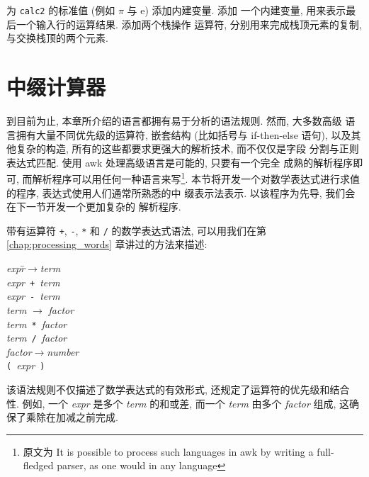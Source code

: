 \begin{exercise}
    \label{exer:calc2}
    为 \texttt{calc2} 的标准值 (例如 $\pi$ 与 $\mathrm{e}$) 添加内建变量.
    添加 一个内建变量, 用来表示最后一个输入行的运算结果. 添加两个栈操作
    运算符, 分别用来完成栈顶元素的复制, 与交换栈顶的两个元素.
\end{exercise}

\section{中缀计算器}
\label{sec:an_infix_calculator}

到目前为止, 本章所介绍的语言都拥有易于分析的语法规则. 然而, 大多数高级
语言拥有大量不同优先级的运算符, 嵌套结构 (比如括号与 if-then-else 语句),
以及其他复杂的构造, 所有的这些都要求更强大的解析技术, 而不仅仅是字段
分割与正则表达式匹配. 使用 awk 处理高级语言是可能的, 只要有一个完全
成熟的解析程序即可, 而解析程序可以用任何一种语言来写\footnote{原文为
    It is possible to process such languages in awk by
writing a full-fledged parser, as one would in any language}.
本节将开发一个对数学表达式进行求值的程序, 表达式使用人们通常所熟悉的中
缀表示法表示. 以该程序为先导, 我们会在下一节开发一个更加复杂的
解析程序.

带有运算符 \verb'+', \verb'-', \verb'*' 和 \verb'/' 的数学表达式语法,
可以用我们在第 \ref{chap:processing_words} 章讲过的方法来描述:
\begin{tabbing}
\indent\textit{expr}\hspace{2em}\=$\to$\hspace{2em}\=\textit{term} \\
\indent\> \> \textit{expr}\ \verb'+'\ \textit{term} \\
\indent\> \> \textit{expr}\ \verb'-'\ \textit{term} \\
\indent\textit{term} \> $\to$ \> \textit{factor} \\
\indent\> \> \textit{term}\ \verb'*'\ \textit{factor} \\
\indent\> \> \textit{term}\ \verb'/'\ \textit{factor} \\
\indent\textit{factor}\>$\to$\>\textit{number} \\
\indent\> \> \verb'('\ \textit{expr}\ \verb')'
\end{tabbing}

该语法规则不仅描述了数学表达式的有效形式, 还规定了运算符的优先级和结合
性. 例如, 一个 \textit{expr} 是多个 \textit{term} 的和或差, 而一个
\textit{term} 由多个 \textit{factor} 组成, 这确保了乘除在加减之前完成.

